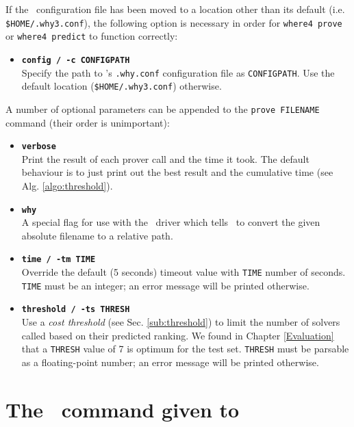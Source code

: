 If the \why~configuration file has been moved to a location other than its default (i.e. \texttt{\$HOME/.why3.conf}), the following option is necessary in order for \texttt{where4 prove} or \texttt{where4 predict} to function correctly:

\begin{itemize}[leftmargin=*]
	\item[] \textbf{\texttt{\textendash\textendash config / -c CONFIGPATH}} \\Specify the path to \why's \texttt{.why.conf} configuration file as \texttt{CONFIGPATH}. Use the default location (\texttt{\$HOME/.why3.conf}) otherwise.
\end{itemize}
	
A number of optional parameters can be appended to the \texttt{prove FILENAME} command (their order is unimportant):
	
\begin{itemize}[leftmargin=*]
	\item[]\textbf{\texttt{\textendash\textendash verbose}}\\ Print the result of each prover call and the time it took. The default behaviour is to just print out the best result and the cumulative time (see Alg. \ref{algo:threshold}).
	\item[]\textbf{\texttt{\textendash\textendash why}}\\
	A special flag for use with the \why~driver which tells \where~to convert the given absolute filename to a relative path.   
	\item[]\textbf{\texttt{\textendash\textendash time / -tm TIME}}\\ Override the default (5 seconds) timeout value with \texttt{TIME} number of seconds. \texttt{TIME} must be an integer; an error message will be printed otherwise.
	\item[]\textbf{\texttt{\textendash\textendash threshold / -ts THRESH}}\\ Use a \textit{cost threshold} (see Sec. \ref{sub:threshold}) to limit the number of solvers called based on their predicted ranking. We found in Chapter \ref{Evaluation} that a \texttt{THRESH} value of 7 is optimum for the test set. \texttt{THRESH} must be parsable as a floating-point number; an error message will be printed otherwise.
\end{itemize} 

\section{The \where~command given to \why}

